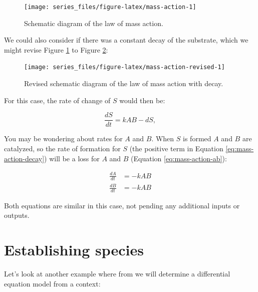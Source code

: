 \documentclass[
]{book}
\theoremstyle{definition}
\theoremstyle{definition}
\theoremstyle{definition}
\theoremstyle{remark}
\begin{document}
\begin{figure}

{\centering \texttt{[image: series\_files/figure-latex/mass-action-1]} 

}

\caption{Schematic diagram of the law of mass action.}\label{fig:mass-action}
\end{figure}

We could also consider if there was a constant decay of the substrate, which we might revise Figure \ref{fig:mass-action} to Figure \ref{fig:mass-action-revised}:

\begin{figure}

{\centering \texttt{[image: series\_files/figure-latex/mass-action-revised-1]} 

}

\caption{Revised schematic diagram of the law of mass action with decay.}\label{fig:mass-action-revised}
\end{figure}

For this case, the rate of change of \(S\) would then be:

\begin{equation}
\frac{dS}{dt}= kAB - dS, \label{eq:mass-action-decay}
\end{equation}

You may be wondering about rates for \(A\) and \(B\). When \(S\) is formed \(A\) and \(B\) are catalyzed, so the rate of formation for \(S\) (the positive term in Equation \eqref{eq:mass-action-decay}) will be a loss for \(A\) and \(B\) (Equation \eqref{eq:mass-action-ab}):

\begin{equation}
\begin{split}
\frac{dA}{dt} &= -kAB \\
\frac{dB}{dt} &= -kAB
\end{split}
\label{eq:mass-action-ab}
\end{equation}

Both equations are similar in this case, not pending any additional inputs or outputs.

\hypertarget{establishing-species}{%
\section{Establishing species}\label{establishing-species}}

Let's look at another example where from we will determine a differential equation model from a context:
\end{document}
